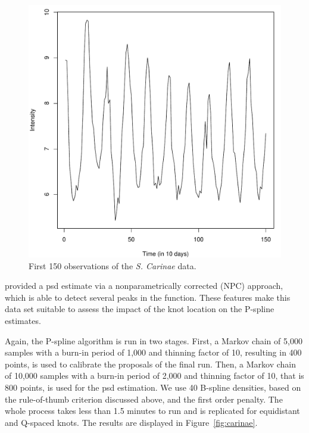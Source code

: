 \documentclass[twocolumn,final]{svjour3}
\begin{document}
\begin{figure}[]
	\centering
	\includegraphics[scale=0.4,clip=true,angle=0]{carinae_data.pdf}
	\caption{First 150 observations of the \textit{S. Carinae} data.}
	\label{fig:carinae_data}
\end{figure}

\cite{Kirch:2018} provided a psd estimate via a nonparametrically corrected (NPC) approach, which is able to detect several peaks in the function.  These features make this data set suitable to assess the impact of the knot location on the P-spline estimates. 

Again, the P-spline algorithm is run in two stages.  First, a Markov chain of 5,000 samples with a burn-in period of 1,000 and thinning factor of 10, resulting in 400 points, is used to calibrate the proposals of the final run.  Then, a Markov chain of 10,000 samples with a burn-in period of 2,000 and thinning factor of 10, that is 800 points, is used for the psd estimation.  We use 40 B-spline densities,  based on the rule-of-thumb criterion discussed above, and the first order penalty.  The whole process takes less than 1.5 minutes to run and is replicated for equidistant and Q-spaced knots. The results are displayed in Figure~\ref{fig:carinae}.
\end{document}

